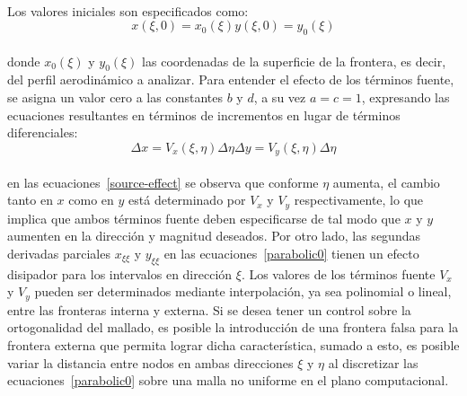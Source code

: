 \documentclass[letterpaper, openright, 12pt]{book}
\begin{document}
    \paragraph*{}
    Los valores iniciales son especificados como:
    \begin{subequations}
        \begin{equation}
            x(\xi, 0) = x_0(\xi)
        \end{equation}
        \begin{equation}
            y(\xi, 0) = y_0(\xi)
        \end{equation}
    \end{subequations}\\
    donde $x_0(\xi)$ y $y_0(\xi)$ las coordenadas de la superficie de la
    frontera, es decir, del perfil aerodinámico a analizar. Para entender el
    efecto de los términos fuente, se asigna un valor cero a las constantes
    $b$ y $d$, a su vez $a = c = 1$, expresando las ecuaciones resultantes
    en términos de incrementos en lugar de términos diferenciales:
    \begin{subequations}
        \begin{equation}
            \Delta x = V_x(\xi, \eta) \Delta \eta
        \end{equation}
        \begin{equation}
            \Delta y = V_y(\xi, \eta) \Delta \eta
        \end{equation}
        \label{source-effect}
    \end{subequations}\\
    en las ecuaciones~\ref{source-effect} se observa que conforme $\eta$
    aumenta, el cambio tanto en $x$ como en $y$ está determinado por $V_x$
    y $V_y$ respectivamente, lo que implica que ambos términos fuente deben
    especificarse de tal modo que $x$ y $y$ aumenten en la dirección y
    magnitud deseados. Por otro lado, las segundas derivadas parciales
    $x_{\xi\xi}$ y $y_{\xi\xi}$ en las ecuaciones~\ref{parabolic0} tienen un
    efecto disipador para los intervalos en dirección $\xi$. Los valores de
    los términos fuente $V_x$ y $V_y$ pueden ser determinados mediante
    interpolación, ya sea polinomial o lineal, entre las fronteras interna y
    externa. Si se desea tener un control sobre la ortogonalidad del
    mallado, es posible la introducción de una frontera falsa para la
    frontera externa que permita lograr dicha característica, sumado a esto,
    es posible variar la distancia entre nodos en ambas direcciones $\xi$ y
    $\eta$ al discretizar las ecuaciones~\ref{parabolic0} sobre una malla no
    uniforme en el plano computacional.
\end{document}
